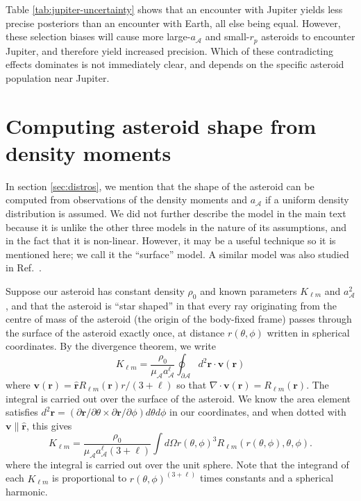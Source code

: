 \documentclass[fleqn,usenatbib]{mnras}
\newcommand{\unit}[1]{\bm{\hat{#1}}}
\begin{document}
Table \ref{tab:jupiter-uncertainty} shows that an encounter with Jupiter yields less precise posteriors than an encounter with Earth, all else being equal. However, these selection biases will cause more large-$a_\mathcal{A}$ and small-$r_p$ asteroids to encounter Jupiter, and therefore yield increased precision. Which of these contradicting effects dominates is not immediately clear, and depends on the specific asteroid population near Jupiter.
  

\section{Computing asteroid shape from density moments}
\label{app:find-surface}

In section \ref{sec:distros}, we mention that the shape of the asteroid can be computed from observations of the density moments and $a_\mathcal{A}$ if a uniform density distribution is assumed. We did not further describe the model in the main text because it is unlike the other three models in the nature of its assumptions, and in the fact that it is non-linear. However, it may be a useful technique so it is mentioned here; we call it the ``surface'' model. A similar model was also studied in Ref.~\cite{BAXANSKY2007756}.

Suppose our asteroid has constant density $\rho_0$ and known parameters $K_{\ell m}$ and $a_\mathcal{A}^2$, and that the asteroid is ``star shaped'' in that every ray originating from the centre of mass of the asteroid (the origin of the body-fixed frame) passes through the surface of the asteroid exactly once, at distance $r(\theta, \phi)$ written in spherical coordinates. By the divergence theorem, we write
\begin{equation}
  K_{\ell m} = \frac{\rho_0}{\mu_\mathcal{A} a_\mathcal{A}^\ell} \oint_{\partial \mathcal{A}} d^2 \bm r \cdot \bm v (\bm r)
\end{equation}
where $\bm v (\bm r) = \unit r R_{\ell m} (\bm r) r / (3+\ell) $ so that $\nabla \cdot \bm v(\bm r) = R_{\ell m}(\bm r)$. The integral is carried out over the surface of the asteroid. We know the area element satisfies $d^2 \bm r = (\partial \bm r / \partial \theta \times \partial \bm r / \partial \phi) d\theta d\phi$ in our coordinates, and when dotted with $\bm v \parallel \unit r$, this gives
\begin{equation}
  K_{\ell m} = \frac{\rho_0 }{\mu_\mathcal{A} a_\mathcal{A}^\ell (3 + \ell)} \int d\Omega r(\theta, \phi)^3 R_{\ell m}(r(\theta, \phi), \theta, \phi).
  \label{eqn:surface-klm}
\end{equation}
where the integral is carried out over the unit sphere. Note that the integrand of each $K_{\ell m}$ is proportional to $r(\theta, \phi)^{(3+\ell)}$ times constants and a spherical harmonic.
\end{document}
